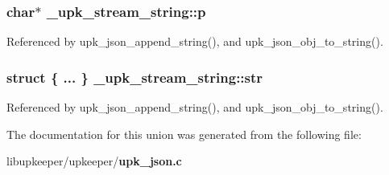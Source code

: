 \subsubsection[{p}]{\setlength{\rightskip}{0pt plus 5cm}char$\ast$ {\bf \_\-upk\_\-stream\_\-string::p}}\label{union__upk__stream__string_a81a3b349f314d5acddf33bb268232af0}


Referenced by upk\_\-json\_\-append\_\-string(), and upk\_\-json\_\-obj\_\-to\_\-string().

\subsubsection[{str}]{\setlength{\rightskip}{0pt plus 5cm}struct \{ ... \}   {\bf \_\-upk\_\-stream\_\-string::str}}\label{union__upk__stream__string_a8331b1605472ee2a403f53c422ac99bd}


Referenced by upk\_\-json\_\-append\_\-string(), and upk\_\-json\_\-obj\_\-to\_\-string().



The documentation for this union was generated from the following file:\begin{DoxyCompactItemize}
\item 
libupkeeper/upkeeper/{\bf upk\_\-json.c}\end{DoxyCompactItemize}
